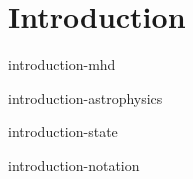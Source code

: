 \tableofcontents
\chapter{Introduction}
\setcounter{page}{1}

 {introduction-mhd}

 {introduction-astrophysics}

 {introduction-state}

 {introduction-notation}